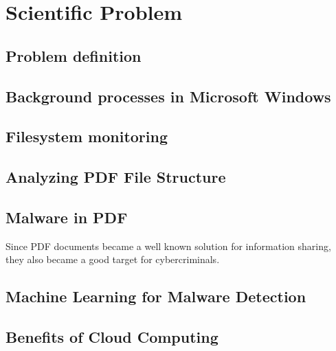 \chapter{Scientific Problem}
\label{section:scientificProblem}


\section{Problem definition}
\label{section:problemDefinition}

\section{Background processes in Microsoft Windows}
\label{section:backgroundProc}

\section{Filesystem monitoring}
\label{section:filesystem}

\section{Analyzing PDF File Structure}
\label{section:pdfStructure}

\section{Malware in PDF}
\label{section:malwareInPDF}
Since PDF documents became a well known solution for information sharing, they also became a good target for cybercriminals.

\section{Machine Learning for Malware Detection}
\label{section:mlForMalware}

\section{Benefits of Cloud Computing}
\label{section:cloudComputing}
